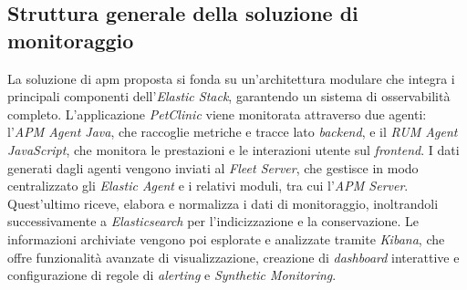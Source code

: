 \subsection{Struttura generale della soluzione di monitoraggio}
La soluzione di \gls{apm} proposta si fonda su un'architettura modulare che integra i principali componenti dell'\emph{Elastic Stack}, garantendo un sistema di osservabilità completo.  
L'applicazione \emph{PetClinic} viene monitorata attraverso due agenti: l'\emph{APM Agent Java}, che raccoglie metriche e tracce lato \emph{backend}, e il \emph{RUM Agent JavaScript}, che monitora le prestazioni e le interazioni utente sul \emph{frontend}.  
I dati generati dagli agenti vengono inviati al \emph{Fleet Server}, che gestisce in modo centralizzato gli \emph{Elastic Agent} e i relativi moduli, tra cui l'\emph{APM Server}.  
Quest'ultimo riceve, elabora e normalizza i dati di monitoraggio, inoltrandoli successivamente a \emph{Elasticsearch} per l'indicizzazione e la conservazione.  
Le informazioni archiviate vengono poi esplorate e analizzate tramite \emph{Kibana}, che offre funzionalità avanzate di visualizzazione, creazione di \emph{dashboard} interattive e configurazione di regole di \emph{alerting} e \emph{Synthetic Monitoring}.  


